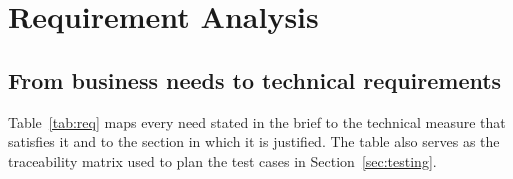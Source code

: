 \documentclass[11pt,a4paper]{article}
\begin{document}
\section{Requirement Analysis}
\label{sec:req}

\subsection{From business needs to technical requirements}

Table~\ref{tab:req} maps every need stated in the brief to the technical measure that satisfies it and to the section in which it is justified. The table also serves as the traceability matrix used to plan the test cases in Section~\ref{sec:testing}.
\end{document}
